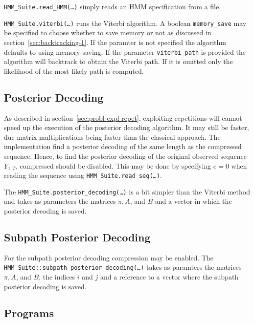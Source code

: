 \texttt{HMM\_Suite.read\_HMM(\dots)} simply reads an HMM specification from a
file.

\texttt{HMM\_Suite.viterbi(\dots)} runs the Viterbi algorithm. A boolean
\texttt{memory\_save} may be specified to choose whether to save memory or not
as discussed in section~\ref{sec:backtracking-1}. If the paramter is not
specified the algorithm defaults to using memory saving. If the parameter
\texttt{viterbi\_path} is provided the algorithm will backtrack to obtain the
Viterbi path. If it is omitted only the likelihood of the most likely path is
computed.

\subsection{Posterior Decoding}

As described in section~\ref{sec:probl-expl-repet}, exploiting repetitions will
cannot speed up the execution of the posterior decoding algorithm. It may still
be faster, due matrix multiplications being faster than the classical
approach. The implementation find a posterior decoding of the same length as
the compressed sequence. Hence, to find the posterior decoding of the original
observed sequence $Y_{1:T}$, compressed should be disabled. This may be done by
specifying $e = 0$ when reading the sequence using
\texttt{HMM\_Suite.read\_seq(\dots)}.

The \texttt{HMM\_Suite.posterior\_decoding(\dots)} is a bit simpler than the
Viterbi method and takes as parameters the matrices $\pi, A$, and $B$ and a
vector in which the posterior decoding is saved.

\subsection{Subpath Posterior Decoding}

For the subpath posterior decoding compression may be enabled. The
\texttt{HMM\_Suite::subpath\_posterior\_decoding(\dots)} takes as paramters the
matrices $\pi, A$, and $B$, the indices $i$ and $j$ and a reference to a vector
where the subpath posterior decoding is saved.

\subsection{Programs}



